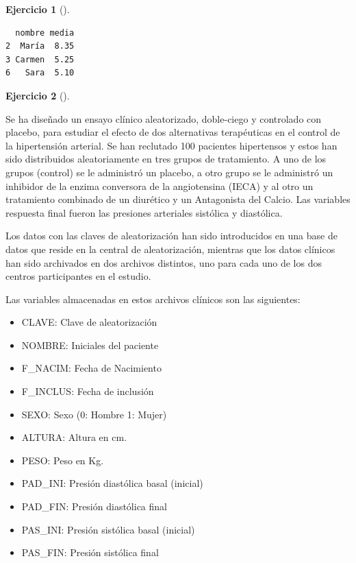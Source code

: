 \documentclass[
  a4paper,
]{scrreport}
\providecommand{\tightlist}{%
  \setlength{\itemsep}{0pt}\setlength{\parskip}{0pt}}\usepackage{longtable,booktabs,array}
\theoremstyle{definition}
\newtheorem{exercise}{Ejercicio}[chapter]
\theoremstyle{remark}
\begin{document}
\begin{exercise}[]
\begin{tcolorbox}
\begin{verbatim}
  nombre media
2  María  8.35
3 Carmen  5.25
6   Sara  5.10
\end{verbatim}

\end{tcolorbox}

\end{exercise}

\leavevmode{}%
\begin{exercise}[]\label{exr-preprocesamiento-5}

Se ha diseñado un ensayo clínico aleatorizado, doble-ciego y controlado
con placebo, para estudiar el efecto de dos alternativas terapéuticas en
el control de la hipertensión arterial. Se han reclutado 100 pacientes
hipertensos y estos han sido distribuidos aleatoriamente en tres grupos
de tratamiento. A uno de los grupos (control) se le administró un
placebo, a otro grupo se le administró un inhibidor de la enzima
conversora de la angiotensina (IECA) y al otro un tratamiento combinado
de un diurético y un Antagonista del Calcio. Las variables respuesta
final fueron las presiones arteriales sistólica y diastólica.

Los datos con las claves de aleatorización han sido introducidos en una
base de datos que reside en la central de aleatorización, mientras que
los datos clínicos han sido archivados en dos archivos distintos, uno
para cada uno de los dos centros participantes en el estudio.

Las variables almacenadas en estos archivos clínicos son las siguientes:

\begin{itemize}
\tightlist
\item
  CLAVE: Clave de aleatorización
\item
  NOMBRE: Iniciales del paciente
\item
  F\_NACIM: Fecha de Nacimiento
\item
  F\_INCLUS: Fecha de inclusión
\item
  SEXO: Sexo (0: Hombre 1: Mujer)
\item
  ALTURA: Altura en cm.
\item
  PESO: Peso en Kg.
\item
  PAD\_INI: Presión diastólica basal (inicial)
\item
  PAD\_FIN: Presión diastólica final
\item
  PAS\_INI: Presión sistólica basal (inicial)
\item
  PAS\_FIN: Presión sistólica final
\end{itemize}


\end{exercise}
\end{document}
